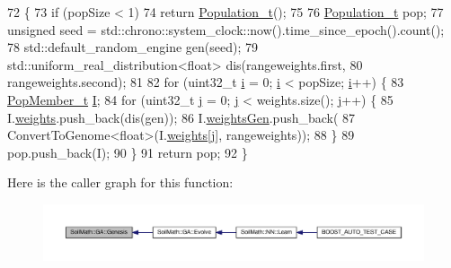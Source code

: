 \begin{DoxyCode}
72                                            \{
73   \textcolor{keywordflow}{if} (popSize < 1)
74     \textcolor{keywordflow}{return} \hyperlink{_soil_math_types_8h_a8d2d4c736cf817d048a2d66dec8b12ec}{Population\_t}();
75 
76   \hyperlink{_soil_math_types_8h_a8d2d4c736cf817d048a2d66dec8b12ec}{Population\_t} pop;
77   \textcolor{keywordtype}{unsigned} seed = std::chrono::system\_clock::now().time\_since\_epoch().count();
78   std::default\_random\_engine gen(seed);
79   std::uniform\_real\_distribution<float> dis(rangeweights.first,
80                                             rangeweights.second);
81 
82   \textcolor{keywordflow}{for} (uint32\_t \hyperlink{_comparision_pictures_2_createtest_image_8m_a6f6ccfcf58b31cb6412107d9d5281426}{i} = 0; \hyperlink{_comparision_pictures_2_createtest_image_8m_a6f6ccfcf58b31cb6412107d9d5281426}{i} < popSize; \hyperlink{_comparision_pictures_2_createtest_image_8m_a6f6ccfcf58b31cb6412107d9d5281426}{i}++) \{
83     \hyperlink{struct_pop_member_struct}{PopMember\_t} \hyperlink{_comparision_pictures_2_createtest_image_8m_aa7400a30a3cc1d4ef58923b44ecb7719}{I};
84     \textcolor{keywordflow}{for} (uint32\_t \hyperlink{_comparision_pictures_2_createtest_image_8m_ac86694252f8dfdb19aaeadc4b7c342c6}{j} = 0; \hyperlink{_comparision_pictures_2_createtest_image_8m_ac86694252f8dfdb19aaeadc4b7c342c6}{j} < weights.size(); \hyperlink{_comparision_pictures_2_createtest_image_8m_ac86694252f8dfdb19aaeadc4b7c342c6}{j}++) \{
85       I.\hyperlink{struct_pop_member_struct_aeba960170ef60a906c730cc24cd90367}{weights}.push\_back(dis(gen));
86       I.\hyperlink{struct_pop_member_struct_a072fadb4863e0cf77b55ad3b46b62522}{weightsGen}.push\_back(
87           ConvertToGenome<float>(I.\hyperlink{struct_pop_member_struct_aeba960170ef60a906c730cc24cd90367}{weights}[\hyperlink{_comparision_pictures_2_createtest_image_8m_ac86694252f8dfdb19aaeadc4b7c342c6}{j}], rangeweights));
88     \}
89     pop.push\_back(I);
90   \}
91   \textcolor{keywordflow}{return} pop;
92 \}
\end{DoxyCode}


Here is the caller graph for this function\+:
\nopagebreak
\begin{figure}[H]
\begin{center}
\leavevmode
\includegraphics[width=350pt]{class_soil_math_1_1_g_a_a96cfe7cc5b3028a66b0136e72ea38cbc_icgraph}
\end{center}
\end{figure}


